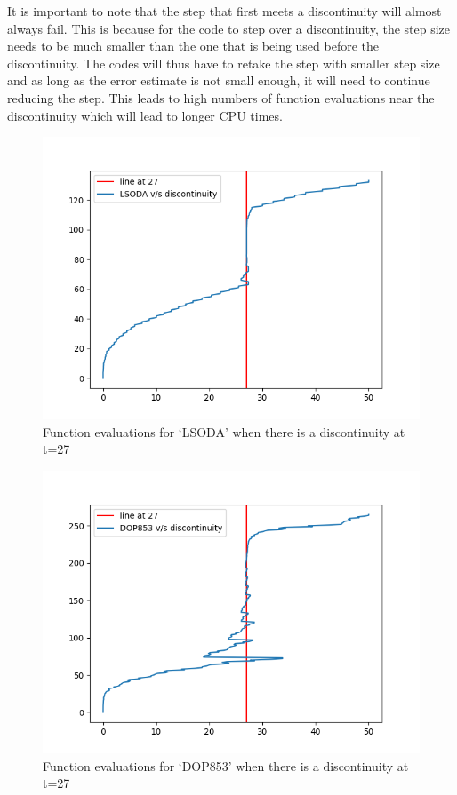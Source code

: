 It is important to note that the step that first meets a discontinuity will almost always fail. This is because for the code to step over a discontinuity, the step size needs to be much smaller than the one that is being used before the discontinuity. The codes will thus have to retake the step with smaller step size and as long as the error estimate is not small enough, it will need to continue reducing the step. This leads to high numbers of function evaluations near the discontinuity which will lead to longer CPU times. 

\begin{figure}[h]
\centering
\includegraphics[width=0.7\linewidth]{./figures/lsoda_vs_discontinuity}
\caption{Function evaluations for `LSODA' when there is a discontinuity at t=27}
\label{fig:lsoda_vs_discontinuity}
\end{figure}

\begin{figure}[h]
\centering
\includegraphics[width=0.7\linewidth]{./figures/dop853_vs_discontinuity}
\caption{Function evaluations for `DOP853' when there is a discontinuity at t=27}
\label{fig:dop853_vs_discontinuity}
\end{figure}

